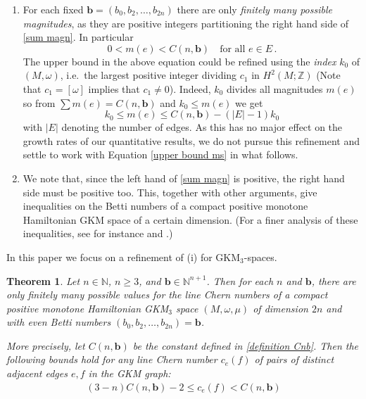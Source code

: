 \documentclass[12pt,a4paper]{amsart}
\newcommand{\ZZ}{\mathbb{Z}}
\newcommand{\NN}{\mathbb{N}}
\newtheorem{thm}{Theorem}[section]
\theoremstyle{plain}
\theoremstyle{definition}
\begin{document}
\begin{enumerate}
\item[(i)] For each fixed $\mathbf{b}=(b_0,b_2,\ldots,b_{2n})$ there are only \emph{finitely many possible magnitudes}, as they are positive integers partitioning the right hand side of \eqref{sum magn}. In particular 
\begin{equation}\label{upper bound ms}
0< m(e)< C(n,\mathbf{b}) \quad \text{for all }e\in E\,.
\end{equation}
The upper bound in the above equation could be refined using the \emph{index} $k_0$ of $(M,\omega)$, i.e.\ 
the largest positive integer dividing $c_1$ in $H^2(M;\ZZ)$ (Note that $c_1=[\omega]$ implies that $c_1\neq 0$). Indeed, $k_0$ divides all magnitudes $m(e)$ so from $\sum m(e)= C(n,\mathbf{b})$ and $k_0\leq m(e)$ we get
\[k_0\leq m(e) \leq C(n,\mathbf{b}) - (|E|-1)k_0\]
with $|E|$ denoting the number of edges. As this has no major effect on the growth rates of our quantitative results, we do not pursue this refinement and settle to work with Equation \eqref{upper bound ms} in what follows.

\item[(ii)] We note that, since the left hand of \eqref{sum magn} is positive, the
	right hand side must be positive too. This, together with other arguments, give
	inequalities on the Betti numbers of a compact positive monotone Hamiltonian GKM space of a certain
	dimension. (For a finer analysis of these inequalities, see for instance 
	\cite[Section 5]{MR3695881} and \cite[Section 4.2]{MR4940256}.)
\end{enumerate}

In this paper we focus on a refinement of (i) for GKM$_3$-spaces. 

 
\begin{thm}\label{thm: mainthm}
Let $n\in \NN$, $n\geq 3$, and $\mathbf{b}\in \NN^{n+1}$. Then for each $n$ and $\mathbf{b}$, there are only finitely many possible values for the line Chern numbers of a compact 
positive monotone
Hamiltonian GKM$_3$ space $(M,\omega,\mu)$ of dimension $2n$ and with even Betti numbers $(b_0,b_2,\ldots,b_{2n})=\mathbf{b}$. 

More precisely, let $C(n,\mathbf{b})$ be the constant defined in \eqref{definition Cnb}. 
Then the following bounds hold for any line Chern number $c_e(f)$ of pairs of distinct adjacent edges $e,f$  in the GKM graph: 
\begin{align}
\label{bound chern line numbers} (3-n)C(n,\mathbf{b})-2\leq c_e(f)< C(n,\mathbf{b})
\end{align}
\end{thm}
\end{document}
